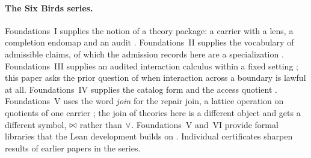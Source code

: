 \paragraph{The Six Birds series.}
Foundations~I supplies the notion of a theory package: a carrier with a lens, a
completion endomap and an audit \citep{TsiokosFoundationsI}. Foundations~II supplies the
vocabulary of admissible claims, of which the admission records here are a
specialization \citep{TsiokosFoundationsII}. Foundations~III supplies an audited
interaction calculus within a fixed setting \citep{TsiokosFoundationsIII}; this paper asks
the prior question of when interaction across a boundary is lawful at all.
Foundations~IV supplies the catalog form and the access quotient
\citep{TsiokosFoundationsIV}. Foundations~V uses the word \emph{join} for the repair join,
a lattice operation on quotients of one carrier \citep{TsiokosFoundationsV}; the join of
theories here is a different object and gets a different symbol, $\bowtie$ rather than
$\vee$. Foundations~V and~VI provide formal libraries that the Lean development
builds on \citep{TsiokosFoundationsV,TsiokosFoundationsVI}. Individual certificates
sharpen results of earlier papers in the series.
